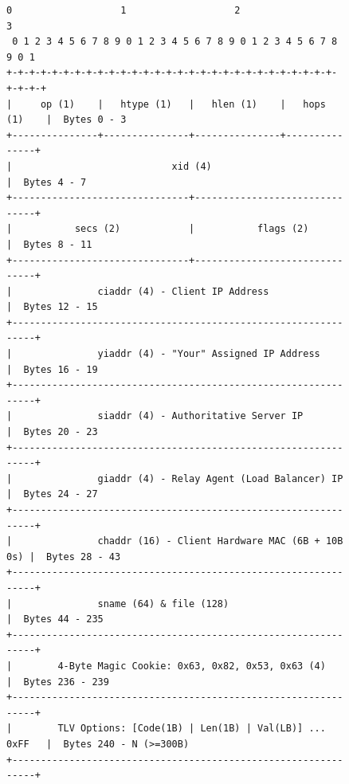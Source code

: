 \documentclass[11pt,a4paper]{article}
\begin{document}
\begin{figure}[H]
\centering
\begin{lstlisting}[numbers=none, frame=single, basicstyle=\ttfamily\scriptsize, caption={RFC 2131 / BOOTP Binary Packet Header Layout and Byte Offsets in \texttt{DhcpPacket.java}.}]
 0                   1                   2                   3
 0 1 2 3 4 5 6 7 8 9 0 1 2 3 4 5 6 7 8 9 0 1 2 3 4 5 6 7 8 9 0 1
+-+-+-+-+-+-+-+-+-+-+-+-+-+-+-+-+-+-+-+-+-+-+-+-+-+-+-+-+-+-+-+-+
|     op (1)    |   htype (1)   |   hlen (1)    |   hops (1)    |  Bytes 0 - 3
+---------------+---------------+---------------+---------------+
|                            xid (4)                            |  Bytes 4 - 7
+-------------------------------+-------------------------------+
|           secs (2)            |           flags (2)           |  Bytes 8 - 11
+-------------------------------+-------------------------------+
|               ciaddr (4) - Client IP Address                  |  Bytes 12 - 15
+---------------------------------------------------------------+
|               yiaddr (4) - "Your" Assigned IP Address         |  Bytes 16 - 19
+---------------------------------------------------------------+
|               siaddr (4) - Authoritative Server IP            |  Bytes 20 - 23
+---------------------------------------------------------------+
|               giaddr (4) - Relay Agent (Load Balancer) IP     |  Bytes 24 - 27
+---------------------------------------------------------------+
|               chaddr (16) - Client Hardware MAC (6B + 10B 0s) |  Bytes 28 - 43
+---------------------------------------------------------------+
|               sname (64) & file (128)                         |  Bytes 44 - 235
+---------------------------------------------------------------+
|        4-Byte Magic Cookie: 0x63, 0x82, 0x53, 0x63 (4)        |  Bytes 236 - 239
+---------------------------------------------------------------+
|        TLV Options: [Code(1B) | Len(1B) | Val(LB)] ... 0xFF   |  Bytes 240 - N (>=300B)
+---------------------------------------------------------------+
\end{lstlisting}
\end{figure}
\end{document}
